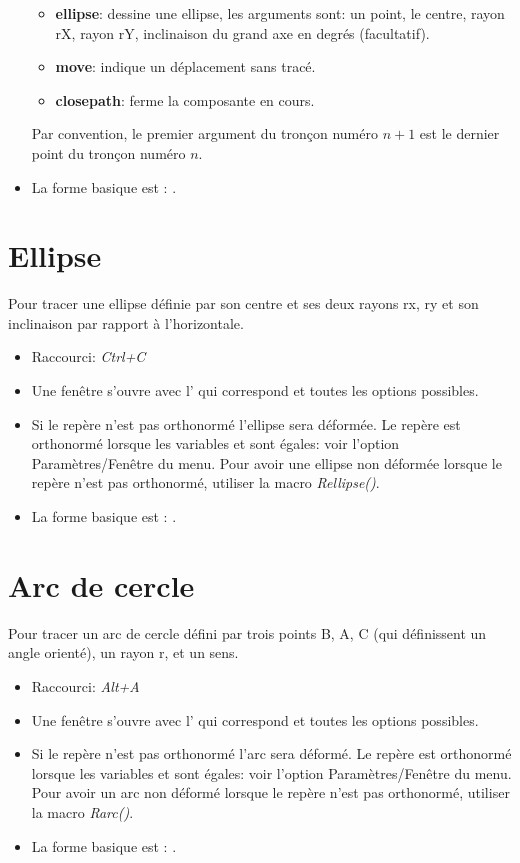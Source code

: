\begin{itemize}
\begin{itemize}
 \item \textbf{ellipse}: dessine une ellipse, les arguments sont: un point, le centre, rayon rX, rayon rY, inclinaison du grand axe en degrés (facultatif).

 \item \textbf{move}: indique un déplacement sans tracé.

 \item \textbf{closepath}: ferme la composante en cours.
\end{itemize}

Par convention, le premier argument du tronçon numéro $n+1$ est le dernier point du tronçon numéro $n$.

\item La forme basique est : .
\end{itemize}


\section{Ellipse}

Pour tracer une ellipse définie par son centre et ses deux rayons rx, ry et son inclinaison par rapport à l'horizontale.

\begin{itemize}
\item Raccourci: \textsl{Ctrl+C}
\item Une fenêtre s'ouvre avec l' qui correspond et toutes les options possibles.
\item Si le repère n'est pas orthonormé l'ellipse sera déformée. Le repère est orthonormé lorsque les variables  et  sont égales: voir l'option Paramètres/Fenêtre du menu. Pour avoir une ellipse non déformée lorsque le repère n'est pas orthonormé, utiliser la macro \textsl{Rellipse()}.
\item La forme basique est : .
\end{itemize}

\section{Arc de cercle}

Pour tracer un arc de cercle défini par trois points B, A, C (qui définissent un angle orienté), un rayon r, et un sens.

\begin{itemize}
\item Raccourci: \textsl{Alt+A}
\item Une fenêtre s'ouvre avec l' qui correspond et toutes les options possibles.
\item Si le repère n'est pas orthonormé l'arc sera déformé. Le repère est orthonormé  lorsque les variables  et  sont égales: voir l'option Paramètres/Fenêtre du menu. Pour avoir un arc non déformé lorsque le repère n'est pas orthonormé, utiliser la macro \textsl{Rarc()}.
\item La forme basique est : .
\end{itemize}


